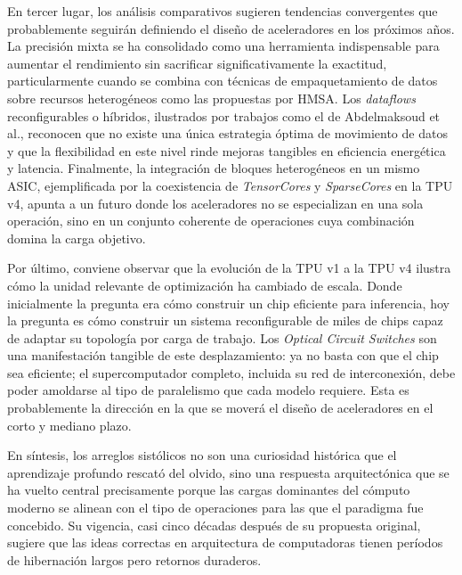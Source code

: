 \documentclass[conference]{IEEEtran}
\begin{document}
En tercer lugar, los análisis comparativos sugieren tendencias convergentes que probablemente seguirán definiendo el diseño de aceleradores en los próximos años. La precisión mixta se ha consolidado como una herramienta indispensable para aumentar el rendimiento sin sacrificar significativamente la exactitud, particularmente cuando se combina con técnicas de empaquetamiento de datos sobre recursos heterogéneos como las propuestas por HMSA. Los \textit{dataflows} reconfigurables o híbridos, ilustrados por trabajos como el de Abdelmaksoud et al., reconocen que no existe una única estrategia óptima de movimiento de datos y que la flexibilidad en este nivel rinde mejoras tangibles en eficiencia energética y latencia. Finalmente, la integración de bloques heterogéneos en un mismo ASIC, ejemplificada por la coexistencia de \textit{TensorCores} y \textit{SparseCores} en la TPU v4, apunta a un futuro donde los aceleradores no se especializan en una sola operación, sino en un conjunto coherente de operaciones cuya combinación domina la carga objetivo.

Por último, conviene observar que la evolución de la TPU v1 a la TPU v4 ilustra cómo la unidad relevante de optimización ha cambiado de escala. Donde inicialmente la pregunta era cómo construir un chip eficiente para inferencia, hoy la pregunta es cómo construir un sistema reconfigurable de miles de chips capaz de adaptar su topología por carga de trabajo. Los \textit{Optical Circuit Switches} son una manifestación tangible de este desplazamiento: ya no basta con que el chip sea eficiente; el supercomputador completo, incluida su red de interconexión, debe poder amoldarse al tipo de paralelismo que cada modelo requiere. Esta es probablemente la dirección en la que se moverá el diseño de aceleradores en el corto y mediano plazo.

En síntesis, los arreglos sistólicos no son una curiosidad histórica que el aprendizaje profundo rescató del olvido, sino una respuesta arquitectónica que se ha vuelto central precisamente porque las cargas dominantes del cómputo moderno se alinean con el tipo de operaciones para las que el paradigma fue concebido. Su vigencia, casi cinco décadas después de su propuesta original, sugiere que las ideas correctas en arquitectura de computadoras tienen períodos de hibernación largos pero retornos duraderos.



\end{document}
